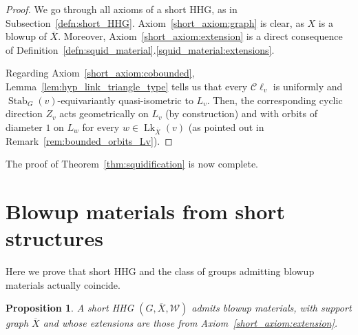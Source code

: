 \documentclass[svgnames]{amsart}
\theoremstyle{plain}
\newtheorem{prop}[thm]{Proposition}
\theoremstyle{definition}
\newcommand{\C}{\mathcal C}
\newcommand{\ov}[1]{\overline{#1}}
\newcommand{\link}{\operatorname{Lk}}
\newcommand{\Stab}[2]{\operatorname{Stab}_{#1}(#2)}
\newcommand{\W}{\mathcal{W}}
\begin{document}
\begin{proof} We go through all axioms of a short HHG, as in Subsection~\ref{defn:short_HHG}. Axiom~\eqref{short_axiom:graph} is clear, as $X$ is a blowup of $\ov X$. Moreover, Axiom~\eqref{short_axiom:extension} is a direct consequence of Definition~\ref{defn:squid_material}.\eqref{squid_material:extensions}.

    Regarding Axiom~\eqref{short_axiom:cobounded}, Lemma~\ref{lem:hyp_link_triangle_type} tells us that every $\C\ell_v$ is uniformly and $\Stab{G}{v}$-equivariantly quasi-isometric to $L_v$. Then, the corresponding cyclic direction $Z_v$ acts geometrically on $L_v$ (by construction) and with orbits of diameter $1$ on $L_w$ for every $w\in\link_{\ov X}(v)$ (as pointed out in Remark~\ref{rem:bounded_orbits_Lv}). 
\end{proof}
The proof of Theorem~\ref{thm:squidification} is now complete.



\section{Blowup materials from short structures}\label{sec:short_to_squid}
Here we prove that short HHG and the class of groups admitting blowup materials actually coincide.
\begin{prop}
\label{prop:short_is_squid}
    A short HHG $(G, \ov X, \W)$ admits blowup materials, with support graph $\ov X$ and whose extensions are those from Axiom~\ref{short_axiom:extension}.
\end{prop}
\end{document}
